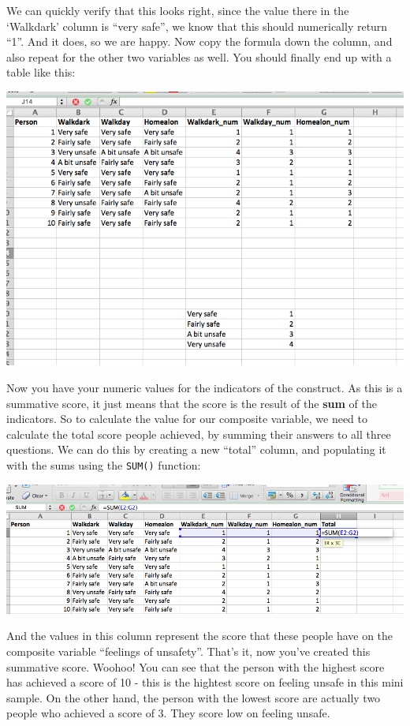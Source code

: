 \documentclass[
]{book}
\begin{document}
We can quickly verify that this looks right, since the value there in the `Walkdark' column is ``very safe'', we know that this should numerically return ``1''. And it does, so we are happy. Now copy the formula down the column, and also repeat for the other two variables as well. You should finally end up with a table like this:

\includegraphics{imgs/final_lookup.png}

Now you have your numeric values for the indicators of the construct. As this is a summative score, it just means that the score is the result of the \textbf{sum} of the indicators. So to calculate the value for our composite variable, we need to calculate the total score people achieved, by summing their answers to all three questions. We can do this by creating a new ``total'' column, and populating it with the sums using the \texttt{SUM()} function:

\includegraphics{imgs/tot_sum_alpha.png}

And the values in this column represent the score that these people have on the composite variable ``feelings of unsafety''. That's it, now you've created this summative score. Woohoo! You can see that the person with the highest score has achieved a score of 10 - this is the hightest score on feeling unsafe in this mini sample. On the other hand, the person with the lowest score are actually two people who achieved a score of 3. They score low on feeling unsafe.
\end{document}

